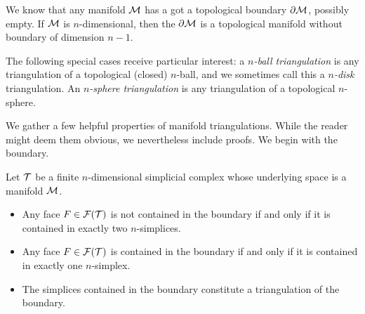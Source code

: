 \documentclass[a4paper]{article}
\begin{document}
We know that any manifold ${\mathcal M}$ has a got a topological boundary $\partial{\mathcal M}$, possibly empty. 
If ${\mathcal M}$ is $n$-dimensional, then the $\partial{\mathcal M}$ is a topological manifold without boundary of dimension $n-1$. 

The following special cases receive particular interest:
a \textit{$n$-ball triangulation} is any triangulation of a topological (closed) $n$-ball,
and we sometimes call this a \textit{$n$-disk} triangulation.
An \textit{$n$-sphere triangulation} is any triangulation of a topological $n$-sphere. 

We gather a few helpful properties of manifold triangulations. 
While the reader might deem them obvious, we nevertheless include proofs. 
We begin with the boundary.

\begin{lemma}\label{lemma:boundarysimplices}
    Let ${\mathcal T}$ be a finite $n$-dimensional simplicial complex whose underlying space is a manifold ${\mathcal M}$. 
    \begin{itemize}
        \item Any face $F \in {\mathcal F}({\mathcal T})$ is not contained in the boundary if and only if it is contained in exactly two $n$-simplices.
        \item Any face $F \in {\mathcal F}({\mathcal T})$ is contained in the boundary if and only if it is contained in exactly one $n$-simplex.
        \item The simplices contained in the boundary constitute a triangulation of the boundary.
    \end{itemize}
\end{lemma}
\end{document}
